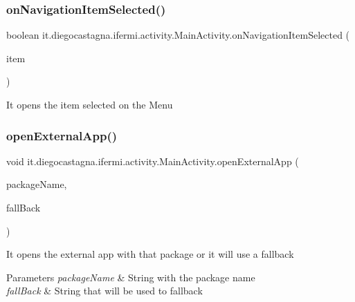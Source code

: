 \subsubsection{\texorpdfstring{onNavigationItemSelected()}{onNavigationItemSelected()}}
{\footnotesize\ttfamily boolean it.\+diegocastagna.\+ifermi.\+activity.\+Main\+Activity.\+on\+Navigation\+Item\+Selected (\begin{DoxyParamCaption}\item[{Menu\+Item}]{item }\end{DoxyParamCaption})\hspace{0.3cm}{\ttfamily [inline]}}

It opens the item selected on the Menu \mbox{\label{classit_1_1diegocastagna_1_1ifermi_1_1activity_1_1_main_activity_a13ab282bb4ca77a5e9532b512fd8d96a}} 
\subsubsection{\texorpdfstring{openExternalApp()}{openExternalApp()}}
{\footnotesize\ttfamily void it.\+diegocastagna.\+ifermi.\+activity.\+Main\+Activity.\+open\+External\+App (\begin{DoxyParamCaption}\item[{String}]{package\+Name,  }\item[{String}]{fall\+Back }\end{DoxyParamCaption})\hspace{0.3cm}{\ttfamily [inline]}}

It opens the external app with that package or it will use a fallback 
\begin{DoxyParams}{Parameters}
{\em package\+Name} & String with the package name \\
\hline
{\em fall\+Back} & String that will be used to fallback \\
\hline
\end{DoxyParams}
\mbox{\label{classit_1_1diegocastagna_1_1ifermi_1_1activity_1_1_main_activity_a42f99843a6cf096f02d0a2559c4b18e1}} 
